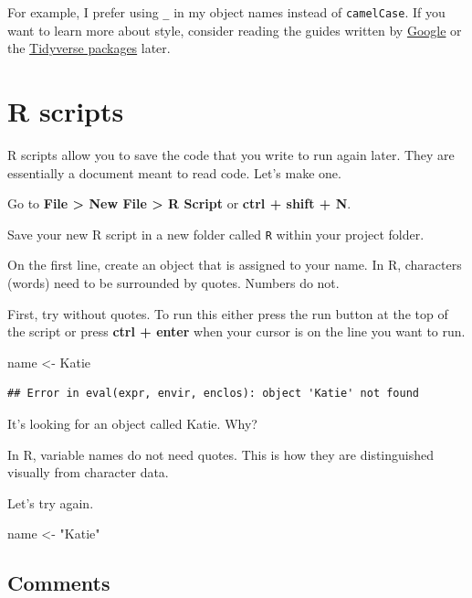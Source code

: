 \documentclass[]{book}
\newenvironment{Shaded}{\begin{snugshade}}{\end{snugshade}}
\newcommand{\StringTok}[1]{\textcolor[rgb]{0.31,0.60,0.02}{#1}}
\newcommand{\NormalTok}[1]{#1}
\begin{document}
For example, I prefer using \texttt{\_} in my object names instead of
\texttt{camelCase}. If you want to learn more about style, consider
reading the guides written by
\href{https://google.github.io/styleguide/Rguide.xml}{Google} or the
\href{https://style.tidyverse.org/}{Tidyverse packages} later.

\section{R scripts}\label{r-scripts}

R scripts allow you to save the code that you write to run again later.
They are essentially a document meant to read code. Let's make one.

Go to \textbf{File \textgreater{} New File \textgreater{} R Script} or
\textbf{ctrl + shift + N}.

Save your new R script in a new folder called \texttt{R} within your
project folder.

On the first line, create an object that is assigned to your name. In R,
characters (words) need to be surrounded by quotes. Numbers do not.

First, try without quotes. To run this either press the run button at
the top of the script or press \textbf{ctrl + enter} when your cursor is
on the line you want to run.

\begin{Shaded}
\begin{Highlighting}[]
\NormalTok{name <-}\StringTok{ }\NormalTok{Katie}
\end{Highlighting}
\end{Shaded}

\begin{verbatim}
## Error in eval(expr, envir, enclos): object 'Katie' not found
\end{verbatim}

It's looking for an object called Katie. Why?

In R, variable names do not need quotes. This is how they are
distinguished visually from character data.

Let's try again.

\begin{Shaded}
\begin{Highlighting}[]
\NormalTok{name <-}\StringTok{ "Katie"}
\end{Highlighting}
\end{Shaded}

\subsection{Comments}\label{comments}
\end{document}
